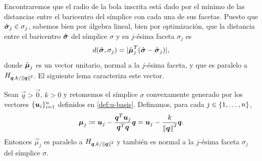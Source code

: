 Encontraremos que el radio de la bola inscrita está dado por el mínimo de las distancias
entre el baricentro del símplice con cada una de sus facetas. Puesto que $\hat{\boldsymbol{ \sigma }}_j \in
\sigma_j$, sabemos bien por álgebra lineal, bien por optimización, que la distancia entre
el baricentro $\hat{\boldsymbol{ \sigma }}$ del símplice $\sigma$ y su $j$-ésima faceta $\sigma_j$ es
\begin{equation}
	\label{eq:dist:v1}
	d(\hat{\boldsymbol{ \sigma }}, \sigma_j) = |\hat{\boldsymbol{\mu}}_j^T(\hat{\boldsymbol{ \sigma }} - \hat{\boldsymbol{ \sigma }}_j)|,
\end{equation}
donde $\hat{\boldsymbol{\mu}}_j$ es un vector unitario, normal a la $j$-ésima faceta, y que
es paralelo a $H_{\boldsymbol{q}, k/\left\lVert \boldsymbol{q} \right\rVert^{2}}$. El siguiente lema caracteriza este vector.

\begin{lemma}
	\label{mu:orth}
	Sean $\vec{q} > \vec{0}$, $k > 0$ y retomemos el símplice $\sigma$ convexamente generado
	por los vectores $\lbrace \boldsymbol{u}_i \rbrace_{i=1}^{n}$ definidos en
	\eqref{def:u-basis}. Definamos, para cada $j \in \lbrace 1, \ldots, n \rbrace$,
	\begin{equation}
		\label{eq:normal}
		\boldsymbol{\mu}_j \coloneq \boldsymbol{u}_j - \frac{\boldsymbol{q}^T\boldsymbol{u}_j}{\boldsymbol{q}^T\boldsymbol{q}}\boldsymbol{q}
		= \boldsymbol{u}_j - \frac{k}{\left\lVert \boldsymbol{q} \right\rVert^2}\boldsymbol{q}.
	\end{equation}
	Entonces $\vec{\mu}_j$ es paralelo a $H_{\boldsymbol{q}, k/\left\lVert \boldsymbol{q} \right\rVert^{2}}$ y también es
	normal a la $j$-ésima faceta $\sigma_j$ del símplice $\sigma$.
\end{lemma}
